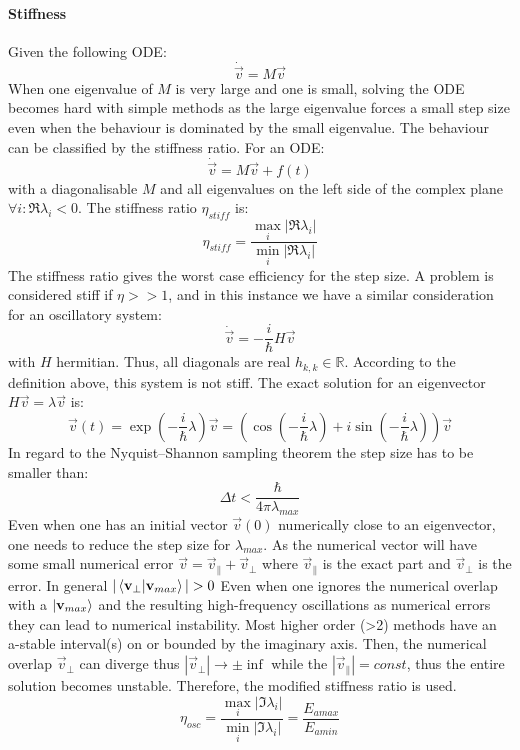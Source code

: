 \documentclass[Master]{subfiles}
\begin{document}
\paragraph {Stiffness}
Given the following ODE:
$$
\dot{\vec{v}} = M \vec{v}
$$
When one eigenvalue of $M$ is very large and one is small, solving the ODE becomes hard with simple methods as the large eigenvalue forces a small step size even when the behaviour is dominated by the small eigenvalue. The behaviour can be classified by the stiffness ratio. For an ODE:
$$
\dot{\vec{v}} = M \vec{v} + f(t)
$$
with a diagonalisable $M$ and all eigenvalues on the left side of the complex plane $\forall i: \Re{\lambda_i} < 0$.
The stiffness ratio $\eta_{stiff}$ is:
$$
\eta_{stiff} = \frac{\max_i |\Re{\lambda_i|}} {\min_i  |\Re{\lambda_i|}}
$$
The stiffness ratio gives the worst case efficiency for the step size.
A problem is considered stiff if $\eta >> 1$,
and in this instance we have a similar consideration for an oscillatory system:
$$
\dot{\vec{v}} =  -\frac{i}{\hbar}H \vec{v}
$$ 
with $H$ hermitian. Thus, all diagonals are real $h_{k,k} \in \mathbb{R}$. According to the definition above, this system is not stiff. The exact solution for an eigenvector $ H \vec{v} = \lambda \vec{v}$ is:
$$\vec{v}(t) =  \exp(-\frac{i}{\hbar} \lambda) \vec{v}  = (\cos(-\frac{i}{\hbar} \lambda) + i \sin(-\frac{i}{\hbar} \lambda))\vec{v}$$
In regard to the Nyquist–Shannon sampling theorem \cite{shannon1949communication} the step size has to be smaller than:
$$\Delta t <  \frac{\hbar}{4 \pi \lambda_{max}}$$ 
Even when one has an initial vector $\vec{v}(0)$ numerically close to an eigenvector, one needs to reduce the step size for $\lambda_{max}$. As the numerical vector will have some small numerical error $\vec{v} = \vec{v}_{\parallel}+\vec{v}_{\bot}$ where $\vec{v}_{\parallel}$ is the exact part and $\vec{v}_{\bot}$ is the error. In general $|\braket{\vec{v}_{\bot}}{\vec{v}_{max}}|> 0$
Even when one ignores the numerical overlap with a $\ket{\mathbf{v}_{max}}$ and the resulting high-frequency oscillations as numerical errors they can lead to numerical instability. Most higher order (>2) methods have an a-stable interval(s) on or bounded by the imaginary axis.
Then, the numerical overlap $\vec{v}_{\bot}$ can diverge thus $|\vec{v}_{\bot}| \rightarrow \pm \inf$ while the  $|\vec{v}_{\parallel}| = \textit{const}$, thus the entire solution becomes unstable. Therefore, the modified stiffness ratio is used.
\begin{dmath}\label{num:modStiffRatio}
\eta_{osc} = \frac{\max_i|\Im{\lambda_i|}} {\min_i|\Im{\lambda_i|}} = \frac{E_{amax}}{E_{amin}}
\end{dmath}
\end{document}
